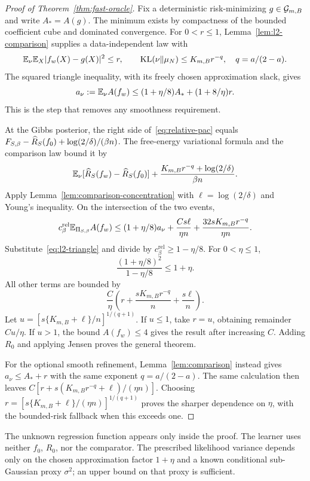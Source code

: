 \begin{proof}[Proof of Theorem~\ref{thm:fast-oracle}]
Fix a deterministic risk-minimizing $g\in\mathcal G_{m,B}$ and write $A_*=A(g)$. The minimum exists by compactness of the bounded coefficient cube and dominated convergence. For $0<r\le1$, Lemma~\ref{lem:l2-comparison} supplies a data-independent law with
\[
 \mathbb E_\nu\mathbb E_X|f_w(X)-g(X)|^2\le r,\qquad
 \operatorname{KL}(\nu\|\mu_N)\le K_{m,B}r^{-q},\quad q=a/(2-a).
\]
The squared triangle inequality, with its freely chosen approximation slack, gives
\begin{equation}
 a_\nu:=\mathbb E_\nu A(f_w)
 \le(1+\eta/8)A_*+(1+8/\eta)r.
 \label{eq:l2-triangle}
\end{equation}
This is the step that removes any smoothness requirement.

At the Gibbs posterior, the right side of~\eqref{eq:relative-pac} equals
$F_{S,\beta}-\widehat R_S(f_0)+\log(2/\delta)/(\beta n)$.
The free-energy variational formula and the comparison law bound it by
\[
 \mathbb E_\nu[\widehat R_S(f_w)-\widehat R_S(f_0)]
       +\frac{K_{m,B}r^{-q}+\log(2/\delta)}{\beta n}.
\]
Apply Lemma~\ref{lem:comparison-concentration} with $\ell=\log(2/\delta)$ and Young's inequality. On the intersection of the two events,
\[
 c_\beta^{\mathrm{rel}}\mathbb E_{\Pi_{S,\beta}}A(f_w)
 \le(1+\eta/8)a_\nu
       +\frac{Cs\ell}{\eta n}
       +\frac{32sK_{m,B}r^{-q}}{\eta n}.
\]
Substitute~\eqref{eq:l2-triangle} and divide by
$c_\beta^{\mathrm{rel}}\ge1-\eta/8$. For $0<\eta\le1$,
\[
 \frac{(1+\eta/8)^2}{1-\eta/8}\le1+\eta.
\]
All other terms are bounded by
\[
 \frac C\eta\left(r+\frac{sK_{m,B}r^{-q}}n+\frac{s\ell}n\right).
\]
Let $u=[s\{K_{m,B}+\ell\}/n]^{1/(q+1)}$. If $u\le1$, take $r=u$, obtaining remainder $Cu/\eta$. If $u>1$, the bound $A(f_w)\le4$ gives the result after increasing $C$. Adding $R_0$ and applying Jensen proves the general theorem.

For the optional smooth refinement, Lemma~\ref{lem:comparison} instead gives
$a_\nu\le A_*+r$ with the same exponent $q=a/(2-a)$. The same calculation then leaves
$C[r+s(K_{m,B}r^{-q}+\ell)/(\eta n)]$. Choosing
$r=[s\{K_{m,B}+\ell\}/(\eta n)]^{1/(q+1)}$ proves the sharper dependence on $\eta$, with the bounded-risk fallback when this exceeds one.
\end{proof}

The unknown regression function appears only inside the proof. The learner uses neither $f_0$, $R_0$, nor the comparator. The prescribed likelihood variance depends only on the chosen approximation factor $1+\eta$ and a known conditional sub-Gaussian proxy $\sigma^2$; an upper bound on that proxy is sufficient.
